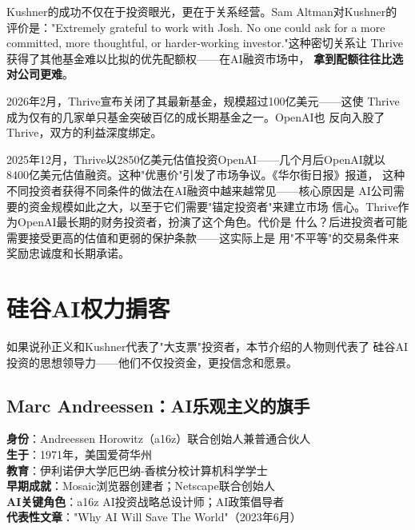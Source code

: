 Kushner的成功不仅在于投资眼光，更在于关系经营。Sam Altman对Kushner的
评价是："Extremely grateful to work with Josh. No one could ask for a more
committed, more thoughtful, or harder-working investor."这种密切关系让
Thrive获得了其他基金难以比拟的优先配额权——在AI融资市场中，
\textbf{拿到配额往往比选对公司更难}。

2026年2月，Thrive宣布关闭了其最新基金，规模超过100亿美元——这使
Thrive成为仅有的几家单只基金突破百亿的成长期基金之一。OpenAI也
反向入股了Thrive，双方的利益深度绑定。

\begin{whybox}
2025年12月，Thrive以2850亿美元估值投资OpenAI——几个月后OpenAI就以
8400亿美元估值融资。这种"优惠价"引发了市场争议。《华尔街日报》报道，
这种不同投资者获得不同条件的做法在AI融资中越来越常见——核心原因是
AI公司需要的资金规模如此之大，以至于它们需要"锚定投资者"来建立市场
信心。Thrive作为OpenAI最长期的财务投资者，扮演了这个角色。代价是
什么？后进投资者可能需要接受更高的估值和更弱的保护条款——这实际上是
用"不平等"的交易条件来奖励忠诚度和长期承诺。
\end{whybox}


\section{硅谷AI权力掮客}
\label{sec:inv-sv-power}

如果说孙正义和Kushner代表了"大支票"投资者，本节介绍的人物则代表了
硅谷AI投资的思想领导力——他们不仅投资金，更投信念和愿景。

\subsection{Marc Andreessen：AI乐观主义的旗手}
\label{subsec:inv-marc}

\begin{corebox}
\textbf{身份}：Andreessen Horowitz（a16z）联合创始人兼普通合伙人 \\
\textbf{生于}：1971年，美国爱荷华州 \\
\textbf{教育}：伊利诺伊大学厄巴纳-香槟分校计算机科学学士 \\
\textbf{早期成就}：Mosaic浏览器创建者；Netscape联合创始人 \\
\textbf{AI关键角色}：a16z AI投资战略总设计师；AI政策倡导者 \\
\textbf{代表性文章}："Why AI Will Save The World"（2023年6月）
\end{corebox}

